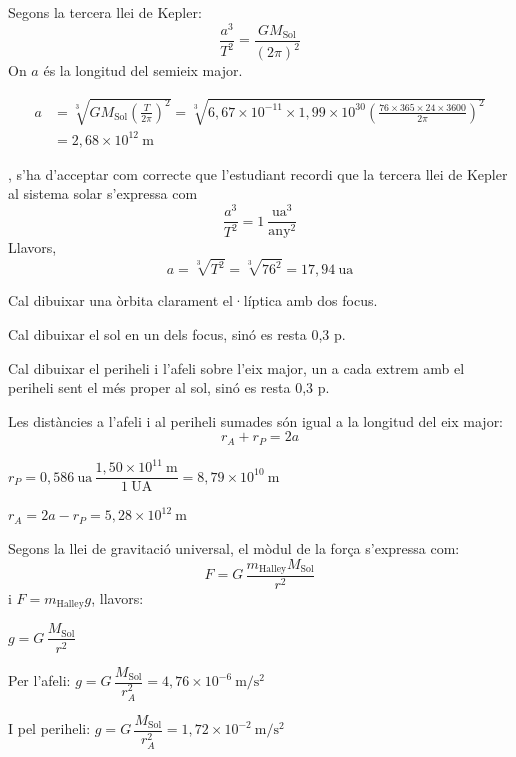 \begin{solapartat}
 Segons la tercera llei de Kepler:
\[ \frac{a^3}{T^2} = \frac{G M_\mathrm{Sol}}{(2\pi)^2} \]
On $a$ és la longitud del semieix major.

\begin{align*}
a &= \sqrt[3]{G M_\mathrm{Sol}\left(\frac{T}{2\pi}\right)^2} = \sqrt[3]{6,67\times 10^{-11}\times 1,99\times 10^{30}\left(\frac{76\times 365\times 24\times 3600}{2\pi}\right)^2}\\
&= 2,68\times 10^{12}\ \mathrm{m}
\end{align*}

, s'ha d'acceptar com correcte que l'estudiant recordi que la tercera llei de Kepler al sistema solar s'expressa com
\[ \frac{a^3}{T^2} = 1\ \frac{\mathrm{ua}^3}{\mathrm{any}^2} \]
Llavors,
\[ a = \sqrt[3]{T^2} = \sqrt[3]{76^2} = 17,94\ \mathrm{ua} \]


Cal dibuixar una òrbita clarament el·líptica amb dos focus.

Cal dibuixar el sol en un dels focus, sinó es resta 0,3 p.

Cal dibuixar el periheli i l'afeli sobre l'eix major, un a cada extrem amb el periheli sent el més proper al sol, sinó es resta 0,3 p.
\end{solapartat}

\begin{solapartat}
 Les distàncies a l'afeli i al periheli sumades són igual a la longitud del eix major:
\[ r_A + r_P = 2a \]

$r_P = 0,586\ \mathrm{ua}\,\dfrac{1,50\times 10^{11}\ \mathrm{m}}{1\ \mathrm{UA}} = 8,79\times 10^{10}\ \mathrm{m}$ 

$r_A = 2a - r_P = 5,28\times 10^{12}\ \mathrm{m}$ 

 Segons la llei de gravitació universal, el mòdul de la força s'expressa com:
\[ F = G\,\frac{m_\mathrm{Halley} M_\mathrm{Sol}}{r^2} \]
i $F = m_\mathrm{Halley}g$, llavors:

 $g = G\,\dfrac{M_\mathrm{Sol}}{r^2}$

Per l'afeli: $g = G\,\dfrac{M_\mathrm{Sol}}{r_A^2} = 4,76\times 10^{-6}\ \mathrm{m/s^2}$ 

I pel periheli: $g = G\,\dfrac{M_\mathrm{Sol}}{r_A^2} = 1,72\times 10^{-2}\ \mathrm{m/s^2}$ 
\end{solapartat}
